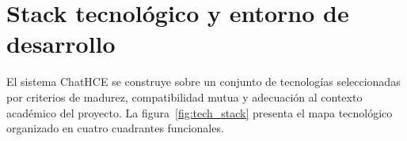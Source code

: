 
\section{Stack tecnológico y entorno de desarrollo}
\label{sec:stack_tecnologico}

El sistema ChatHCE se construye sobre un conjunto de tecnologías
seleccionadas por criterios de madurez, compatibilidad mutua y
adecuación al contexto académico del proyecto.
La figura~\ref{fig:tech_stack} presenta el mapa tecnológico
organizado en cuatro cuadrantes funcionales.

